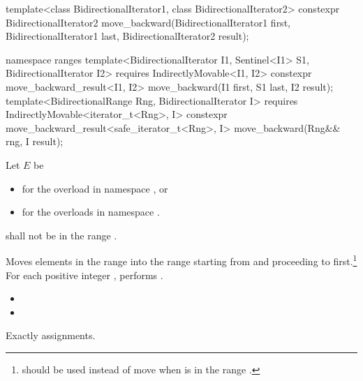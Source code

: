 %
\begin{itemdecl}
template<class BidirectionalIterator1, class BidirectionalIterator2>
  constexpr BidirectionalIterator2
    move_backward(BidirectionalIterator1 first, BidirectionalIterator1 last,
                  BidirectionalIterator2 result);
\end{itemdecl}
\begin{addedblock}
\begin{itemdecl}
namespace ranges {
  template<BidirectionalIterator I1, Sentinel<I1> S1, BidirectionalIterator I2>
    requires IndirectlyMovable<I1, I2>
    constexpr move_backward_result<I1, I2>
      move_backward(I1 first, S1 last, I2 result);
  template<BidirectionalRange Rng, BidirectionalIterator I>
    requires IndirectlyMovable<iterator_t<Rng>, I>
    constexpr move_backward_result<safe_iterator_t<Rng>, I>
      move_backward(Rng&& rng, I result);
}
\end{itemdecl}
\end{addedblock}

\begin{itemdescr}
\begin{addedblock}
\pnum
Let $E$ be
\begin{itemize}
\item {} for the overload in namespace , or
\item {} for the overloads in namespace .
\end{itemize}
\end{addedblock}

\pnum
\requires
{}
shall not be in the range
.

\pnum
\effects
Moves elements in the range 
into the
range 
starting from
and proceeding to first.\footnote{
should be used instead of move when 
is in
the range
.}
For each positive integer
,
performs
.

\pnum
\returns
\begin{itemize}
\item {} 
\item {}
\end{itemize}

\pnum
\complexity
Exactly
assignments.
\end{itemdescr}


